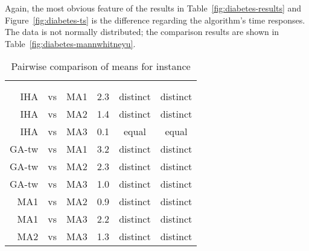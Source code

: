 \documentclass[thesis.tex]{subfiles}
\begin{document}
\subsubsection{}
   \renewcommand{\CurrentInstance}{\Instance{diabetes}}
   \renewcommand{\CurrentInstanceFileEscaped}{diabetes}
   \renewcommand{\CurrentInstanceTexEscaped}{diabetes}


Again, the most obvious feature of the results in Table~\vref{fig:diabetes-results} and Figure~\vref{fig:diabetes-ts} is the difference regarding the algorithm's time responses. The data is not normally distributed; the comparison results are shown in Table~\vref{fig:diabetes-mannwhitneyu}.
\begin{table}[htbp]
   \caption{Pairwise comparison of means for instance \CurrentInstance}
   \label{fig:\CurrentInstanceFileEscaped-mannwhitneyu}
   \centering\small
      \begin{tabular}{r@{\ }c@{\ }l S[table-format=2.2] c c} \toprule
         &&&                          &  \\ \cmidrule(lr){5-6}
         &&&  &  &  \\ \midrule

         \gls{IHA} &vs& \gls{MA1}   &  2.3  & distinct & distinct \\
         \gls{IHA} &vs& \gls{MA2}   &  1.4  & distinct & distinct \\
         \gls{IHA} &vs& \gls{MA3}   &  0.1  &  equal   &  equal   \\
         \gls{GA-tw} &vs& \gls{MA1} &  3.2  & distinct & distinct \\
         \gls{GA-tw} &vs& \gls{MA2} &  2.3  & distinct & distinct \\
         \gls{GA-tw} &vs& \gls{MA3} &  1.0  & distinct & distinct \\
         \gls{MA1} &vs& \gls{MA2}   &  0.9  & distinct & distinct \\
         \gls{MA1} &vs& \gls{MA3}   &  2.2  & distinct & distinct \\
         \gls{MA2} &vs& \gls{MA3}   &  1.3  & distinct & distinct \\
         \bottomrule
      \end{tabular}
\end{table}
\end{document}
